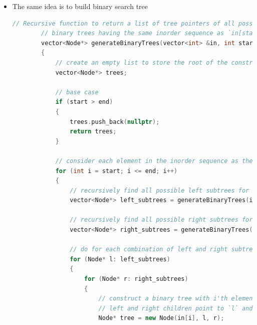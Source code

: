 \documentclass[a4paper,11pt,twoside]{book}
\begin{document}
\begin{itemize}
\begin{itemize}
	\begin{lstlisting}	
		((ab)c)d     (a(bc))d     (ab)(cd)     a((bc)d)     a(b(cd))
	\end{lstlisting}
	
	\begin{lstlisting}[frame=single, language=c++]
		vector<string> ap(string& s, int i, int j) {
			vector<string> result;
			if (i == j-1 && i<s.size()) {
				result.push_back("("+s.substr(i,1)+")");
				return result;
			}
			if (i == j - 2 && i<s.size()-1) {
				result.push_back("(" + s.substr(i, 2) + ")");
				return result;
			}	
			for (int k = i; k < j-1; ++k) {
				vector<string> v1 = ap(s, i, k+1);
				vector<string> v2 = ap(s, k+1 , j);
				
				string rs;
				for (auto e : v1) {
					for (auto e1 : v2) {
						rs =  e;
						rs += e1;
						result.push_back(rs);
					}
				}
			}
			return result;
		}
		
		string s = "abcd";
		auto com = ap(s, 0, 4);
		
		for (auto e : com) {
			cout << e << endl;
		}
		
		(a)(b)(cd)
		(a)(bc)(d)
		(ab)(cd)
		(a)(bc)(d)
		(ab)(c)(d)
	\end{lstlisting}
	
	\item The same idea is to build binary search tree
	\begin{lstlisting}[frame=single, language=c++]
		// Recursive function to return a list of tree pointers of all possible
		// binary trees having the same inorder sequence as `in[start, end]`
		vector<Node*> generateBinaryTrees(vector<int> &in, int start, int end)
		{
			// create an empty list to store the root of the constructed binary trees
			vector<Node*> trees;
			
			// base case
			if (start > end)
			{
				trees.push_back(nullptr);
				return trees;
			}
			
			// consider each element in the inorder sequence as the root
			for (int i = start; i <= end; i++)
			{
				// recursively find all possible left subtrees for root `i`
				vector<Node*> left_subtrees = generateBinaryTrees(in, start, i - 1);
				
				// recursively find all possible right subtrees for root `i`
				vector<Node*> right_subtrees = generateBinaryTrees(in, i + 1, end);
				
				// do for each combination of left and right subtrees
				for (Node* l: left_subtrees)
				{
					for (Node* r: right_subtrees)
					{
						// construct a binary tree with i'th element as the root and whose
						// left and right children point to `l` and `r`, respectively
						Node* tree = new Node(in[i], l, r);
						

\end{lstlisting}
\end{itemize}
\end{itemize}
\end{document}
